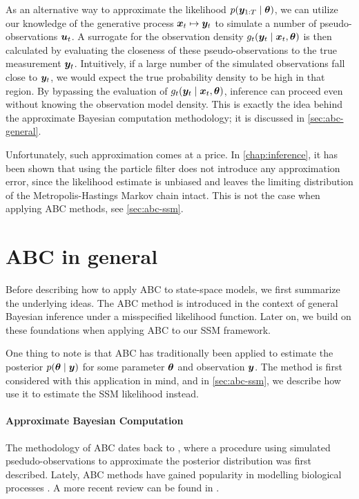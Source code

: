 As an alternative way to approximate the likelihood ${p(\bm{y}_{1:T} \mid \bm{\theta})}$, we can utilize our knowledge of the generative process $\bm{x}_t \mapsto \bm{y}_t$ to simulate a number of pseudo-observations $\bm{u}_t$. A surrogate for the observation density $g_t(\bm{y}_t \mid \bm{x}_t, \bm{\theta})$ is then calculated by evaluating the closeness of these pseudo-observations to the true measurement $\bm{y}_t$. Intuitively, if a large number of the simulated observations fall close to $\bm{y}_t$, we would expect the true probability density to be high in that region. By bypassing the evaluation of $g_t(\bm{y}_t \mid \bm{x}_t, \bm{\theta})$, inference can proceed even without knowing the observation model density. This is exactly the idea behind the approximate Bayesian computation methodology; it is discussed in \autoref{sec:abc-general}.

Unfortunately, such approximation comes at a price. In \autoref{chap:inference}, it has been shown that using the particle filter does not introduce any approximation error, since the likelihood estimate is unbiased and leaves the limiting distribution of the Metropolis-Hastings Markov chain intact. This is not the case when applying ABC methods, see \autoref{sec:abc-ssm}.


\section{ABC in general} \label{sec:abc-general}
Before describing how to apply ABC to state-space models, we first summarize the underlying ideas. The ABC method is introduced in the context of general Bayesian inference under a misspecified likelihood function. Later on, we build on these foundations when applying ABC to our SSM framework.

One thing to note is that ABC has traditionally been applied to estimate the posterior $p(\bm{\theta} \mid \bm{y})$ for some parameter $\bm{\theta}$ and observation $\bm{y}$. The method is first considered with this application in mind, and in \autoref{sec:abc-ssm}, we describe how use it to estimate the SSM likelihood instead.

\paragraph{Approximate Bayesian Computation}
The methodology of ABC dates back to \cite{abc-old-old}, where a procedure using simulated psedudo-observations to approximate the posterior distribution was first described. Lately, ABC methods have gained popularity in modelling biological processes \citep{abc-old}. A more recent review can be found in \cite{abc-recent, abc-super-recent}.

